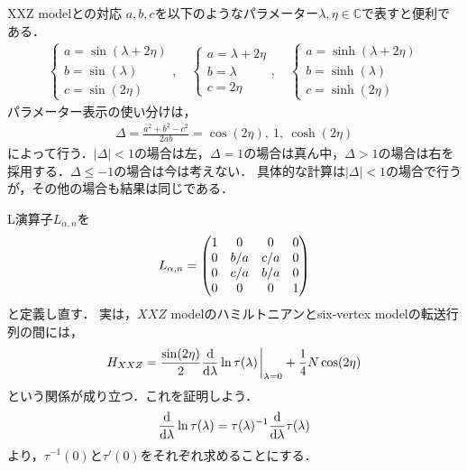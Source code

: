 \documentclass[dvipdfmx,9pt]{beamer}
\numberwithin{equation}{section}
\begin{document}
\begin{frame}{XXZ modelとの対応}
    $a,b,c$を以下のようなパラメーター$\lambda,\eta \in \mathbb{C}$で表すと便利である．
    \begin{align}
        \begin{cases}
            a = \sin (\lambda + 2\eta)
            \\
            b = \sin (\lambda)
            \\
            c = \sin (2\eta)
        \end{cases},
        \quad
        \begin{cases}
            a = \lambda + 2\eta
            \\
            b = \lambda
            \\
            c = 2\eta
        \end{cases},
        \quad
        \begin{cases}
            a = \sinh (\lambda + 2\eta)
            \\
            b = \sinh (\lambda)
            \\
            c = \sinh (2\eta)
        \end{cases}
    \end{align}
    パラメーター表示の使い分けは，
    \begin{align}
        \Delta = \frac{a^2+b^2-c^2}{2ab} = \cos(2\eta),~ 1,~ \cosh(2\eta)
    \end{align}
    によって行う．$|\Delta| < 1$の場合は左，$\Delta = 1$の場合は真ん中，$\Delta > 1$の場合は右を採用する．$\Delta \le -1$の場合は今は考えない．
    具体的な計算は$|\Delta| < 1$の場合で行うが，その他の場合も結果は同じである．
\end{frame}

\begin{frame}{}
    L演算子$L_{\alpha,n}$を
    \begin{align}
          L_{\alpha,n} = \mqty(
            1&0&0&0 \\
            0&b/a&c/a&0 \\
            0&c/a&b/a&0 \\
            0&0&0&1
        )
    \end{align}
    と定義し直す．
    実は，$XXZ$ modelのハミルトニアンとsix-vertex modelの転送行列の間には，
    \begin{align}
        H_{XXZ} = \frac{\sin(2\eta)}{2}\dv{\lambda} \ln \tau(\lambda) \eval_{\lambda = 0} + \frac{1}{4}N\cos(2\eta)
    \end{align}
    という関係が成り立つ．これを証明しよう．
    \begin{align}
        \dv{\lambda}\ln\tau(\lambda) = \tau(\lambda)^{-1} \dv{\lambda}\tau(\lambda)
    \end{align}
    より，$\tau^{-1}(0)$と$\tau'(0)$をそれぞれ求めることにする．
\end{frame}
\end{document}
